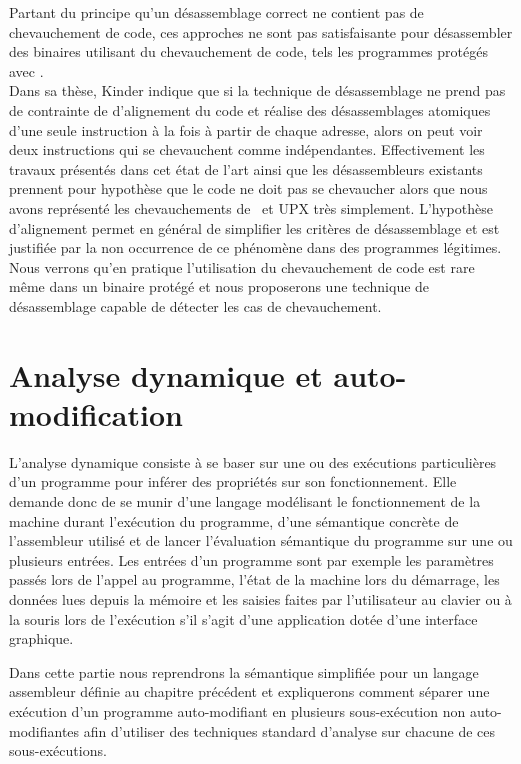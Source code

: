 Partant du principe qu'un désassemblage correct ne contient pas de chevauchement de code, ces approches ne sont pas satisfaisante pour désassembler des binaires utilisant du chevauchement de code, tels les programmes protégés avec \telock.
\\

Dans sa thèse, Kinder \cite{Kinder10} indique que si la technique de désassemblage ne prend pas de contrainte de d'alignement du code et réalise des désassemblages atomiques d'une seule instruction à la fois à partir de chaque adresse, alors on peut voir deux instructions qui se chevauchent comme indépendantes. Effectivement les travaux présentés dans cet état de l'art ainsi que les désassembleurs existants prennent pour hypothèse que le code ne doit pas se chevaucher alors que nous avons représenté les chevauchements de \telock\ et UPX très simplement. L'hypothèse d'alignement permet en général de simplifier les critères de désassemblage et est justifiée par la non occurrence de ce phénomène dans des programmes légitimes.
Nous verrons qu'en pratique l'utilisation du chevauchement de code est rare même dans un binaire protégé et nous proposerons une technique de désassemblage capable de détecter les cas de chevauchement.


\section{Analyse dynamique et auto-modification}
L'analyse dynamique consiste à se baser sur une ou des exécutions particulières d'un programme pour inférer des propriétés sur son fonctionnement.
Elle demande donc de se munir d'une langage modélisant le fonctionnement de la machine durant l'exécution du programme, d'une sémantique concrète de l'assembleur utilisé et de lancer l'évaluation sémantique du programme sur une ou plusieurs entrées.
Les entrées d'un programme sont par exemple les paramètres passés lors de l'appel au programme, l'état de la machine lors du démarrage, les données lues depuis la mémoire et les saisies faites par l'utilisateur au clavier ou à la souris lors de l'exécution s'il s'agit d'une application dotée d'une interface graphique.

Dans cette partie nous reprendrons la sémantique simplifiée pour un langage assembleur définie au chapitre précédent et expliquerons comment séparer une exécution d'un programme auto-modifiant en plusieurs sous-exécution non auto-modifiantes afin d'utiliser des techniques standard d'analyse sur chacune de ces sous-exécutions.



